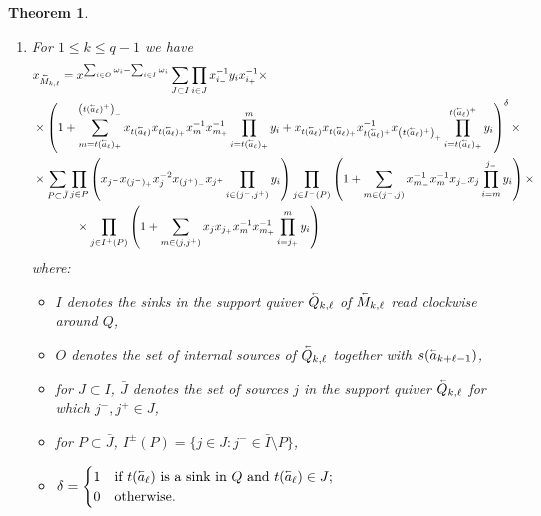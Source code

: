 \documentclass[11pt]{amsart}
\renewcommand{\vec}[1]{\accentset{\shortrightarrow}{#1}}
\newcommand{\cev}[1]{\accentset{\shortleftarrow}{#1}}
\newtheorem{theorem}{Theorem}[section]
\numberwithin{equation}{section}
\begin{document}
\begin{theorem}
\begin{enumerate}
\begin{itemize}
        \item $\delta=\begin{cases}1 & \text{if $t(\vec{a}_\ell)$ is a sink in $Q$ and $t(\vec{a}_\ell)\in J$;}\\0 & \text{otherwise.}\end{cases}$
      \end{itemize}
      \item For $1\le k\le q-1$ we have
      \begin{align}
        &x_{\cev{M}_{k,\ell}}=x^{\sum_{i\in O}\omega_i-\sum_{i\in I}\omega_i}\sum_{J\subset I}\prod_{i\in J}x_{i_-}^{-1}y_ix_{i_+}^{-1}\times\\
        \nonumber&\times\left(1+\sum_{m=t(\cev{a}_\ell)_+}^{\left(t(\cev{a}_\ell)^+\right)_-}x_{t(\cev{a}_\ell)}x_{t(\cev{a}_\ell)_+}x_m^{-1}x_{m_+}^{-1}\prod_{i=t(\cev{a}_\ell)_+}^m y_i+x_{t(\cev{a}_\ell)}x_{t(\cev{a}_\ell)_+}x_{t(\cev{a}_\ell)^+}^{-1}x_{\left(t(\cev{a}_\ell)^+\right)_+}\prod_{i=t(\cev{a}_\ell)_+}^{t(\cev{a}_\ell)^+}y_i\right)^\delta\times\\
        \nonumber&\times\sum_{P\subset\bar{J}}\prod_{j\in P}\left(x_{j^-}x_{(j^-)_+}x_j^{-2}x_{(j^+)_-}x_{j^+}\prod_{i\in(j^-,j^+)}y_i\right)\prod_{j\in I^-(P)}\left(1+\sum_{m\in(j^-,j)}x_{m_-}^{-1}x_m^{-1}x_{j_-}x_j\prod_{i=m}^{j_-}y_i\right)\times\\
        \nonumber&\hspace{0.5in}\times\prod_{j\in I^+(P)}\left(1+\sum_{m\in(j,j^+)}x_jx_{j_+}x_m^{-1}x_{m_+}^{-1}\prod_{i=j_+}^m y_i\right)
      \end{align}
      where:
      \begin{itemize}
        \item $I$ denotes the sinks in the support quiver $\cev{Q}_{k,\ell}$ of $\cev{M}_{k,\ell}$ read clockwise around $Q$,
        \item $O$ denotes the set of internal sources of $\cev{Q}_{k,\ell}$ together with $s(\cev{a}_{k+\ell-1})$,
        \item for $J\subset I$, $\bar{J}$ denotes the set of sources $j$ in the support quiver $\cev{Q}_{k,\ell}$ for which $j^-,j^+\in J$,
        \item for $P\subset\bar{J}$, $I^\pm(P)=\{j\in J:j^-\in\bar{I}\setminus P\}$,
        \item $\delta=\begin{cases}1 & \text{if $t(\cev{a}_\ell)$ is a sink in $Q$ and $t(\cev{a}_\ell)\in J$;}\\0 & \text{otherwise.}\end{cases}$
      \end{itemize}
    \end{enumerate}
  \end{theorem}
\end{document}

